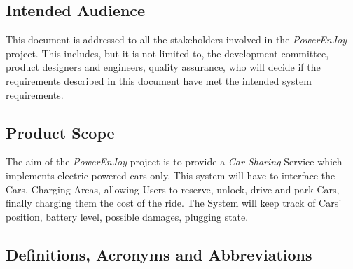 \subsection{Intended Audience}
This document is addressed to all the stakeholders involved in the \emph{PowerEnJoy} project. This includes, but it is not limited to, the development committee, product designers and engineers, quality assurance, who will decide if the requirements described in this document have met the intended system requirements.

\subsection{Product Scope}
The aim of the \emph{PowerEnJoy} project is to provide a \textit{Car-Sharing} Service which implements electric-powered cars only.
This system will have to interface the Cars, Charging Areas, allowing Users to reserve, unlock, drive and park Cars, finally charging them the cost of the ride. 
The System will keep track of Cars' position, battery level, possible damages, plugging state.

\subsection{Definitions, Acronyms and Abbreviations}
